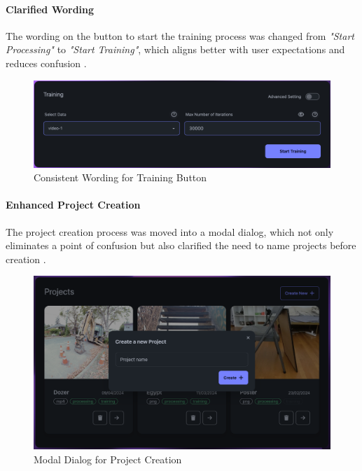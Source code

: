 \paragraph{Clarified Wording}
The wording on the button to start the training process was changed from \emph{"Start Processing"} to \emph{"Start Training"}, which aligns better with user expectations and reduces confusion .

\begin{figure}[htb]
	\includegraphics[width=\textwidth]{figures/fix-2.png}
	\caption{Consistent Wording for Training Button}
  \label{fig:fix-2}
\end{figure}

\paragraph{Enhanced Project Creation}
The project creation process was moved into a modal dialog, which not only eliminates a point of confusion but also clarified the need to name projects before creation .

\begin{figure}[htb]
	\includegraphics[width=\textwidth]{figures/fix-3.png}
	\caption{Modal Dialog for Project Creation}
  \label{fig:fix-3}
\end{figure}

